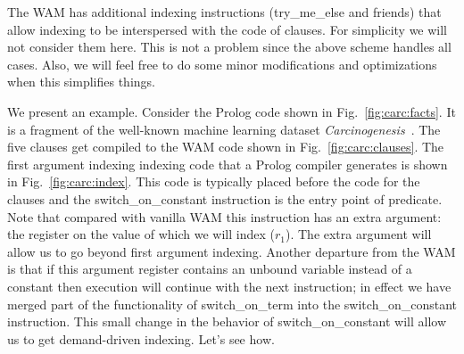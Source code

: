 \documentclass{llncs}
\newcommand{\instr}[1]{\textsf{#1}}
\newcommand{\switchONterm}{\mbox{\instr{switch\_on\_term}}\xspace}
\newcommand{\switchONconstant}{\mbox{\instr{switch\_on\_constant}}\xspace}
\newcommand{\JITI}{demand-driven indexing\xspace}
\begin{document}
The WAM has additional indexing instructions (\instr{try\_me\_else}
and friends) that allow indexing to be interspersed with the code of
clauses. For simplicity we will not consider them here. This is not a
problem since the above scheme handles all cases. Also, we will feel
free to do some minor modifications and optimizations when this
simplifies things.

We present an example. Consider the Prolog code shown in
Fig.~\ref{fig:carc:facts}. It is a fragment of the well-known machine
learning dataset \textit{Carcinogenesis}~\cite{Carcinogenesis@ILP-97}.
The five clauses get compiled to the WAM code shown in
Fig.~\ref{fig:carc:clauses}. The first argument indexing indexing code
that a Prolog compiler generates is shown in
Fig.~\ref{fig:carc:index}. This code is typically placed before the
code for the clauses and the \switchONconstant instruction is the
entry point of predicate. Note that compared with vanilla WAM this
instruction has an extra argument: the register on the value of which
we will index ($r_1$). The extra argument will allow us to go beyond
first argument indexing. Another departure from the WAM is that if
this argument register contains an unbound variable instead of a
constant then execution will continue with the next instruction; in
effect we have merged part of the functionality of \switchONterm into
the \switchONconstant instruction. This small change in the behavior
of \switchONconstant will allow us to get \JITI. Let's see how.
\end{document}
